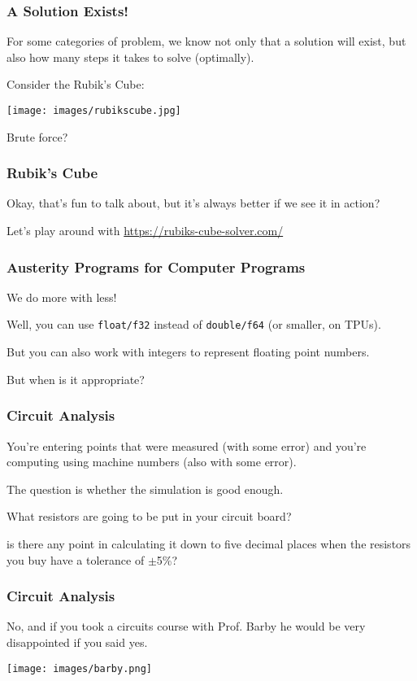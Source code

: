 \begin{frame}
\frametitle{A Solution Exists!}

For some categories of problem, we know not only that a solution will exist, but also how many steps it takes to solve (optimally). 

Consider the Rubik's Cube:

\begin{center}
	\texttt{[image: images/rubikscube.jpg]}
\end{center}

Brute force?

\end{frame}


\begin{frame}
\frametitle{Rubik's Cube}

Okay, that's fun to talk about, but it's always better if we see it in action? 

Let's play around with \url{https://rubiks-cube-solver.com/}

\end{frame}



\begin{frame}
\frametitle{Austerity Programs for Computer Programs}

We do more with less! 

Well, you can use \texttt{float/f32} instead of \texttt{double/f64} (or smaller, on TPUs). 

But you can also work with integers to represent floating point numbers.

But when is it appropriate?


\end{frame}


\begin{frame}
\frametitle{Circuit Analysis}

You're entering points that were measured (with some error) and you're computing using machine numbers (also with some error).

The question is whether the simulation is good enough.

What resistors are going to be put in your circuit board?

is there any point in calculating it down to five decimal places when the resistors you buy have a tolerance of $\pm$5\%? 

\end{frame}


\begin{frame}
\frametitle{Circuit Analysis}


No, and if you took a circuits course with Prof. Barby he would be very disappointed if you said yes.

\begin{center}
	\texttt{[image: images/barby.png]}
\end{center}

\end{frame}


